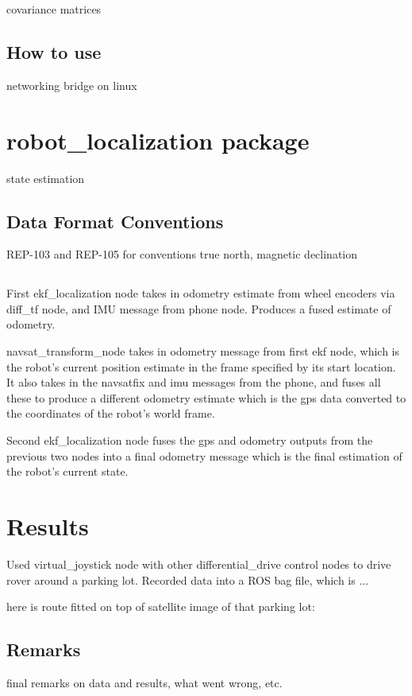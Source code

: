 covariance matrices

\subsection{How to use}
networking bridge
on linux


\section{robot\_localization package}

state estimation
\subsection{Data Format Conventions}
REP-103 and REP-105 for conventions
true north, magnetic declination

\subsection{}
First ekf\_localization node takes in odometry estimate from wheel encoders via diff\_tf node, and IMU message from phone node. Produces a fused estimate of odometry.

navsat\_transform\_node takes in odometry message from first ekf node, which is the robot’s current position estimate in the frame specified by its start location. It also takes in the navsatfix and imu messages from the phone, and fuses all these to produce a different odometry estimate which is the gps data converted to the coordinates of the robot's world frame.

Second ekf\_localization node fuses the gps and odometry outputs from the previous two nodes into a final odometry message which is the final estimation of the robot's current state.


\cite{robot_localization_paper}

\section{Results}

Used virtual\_joystick node with other differential\_drive control nodes to drive rover around a parking lot. Recorded data into a ROS bag file, which is ...

here is route fitted on top of satellite image of that parking lot:

\subsection{Remarks}
final remarks on data and results, what went wrong, etc.